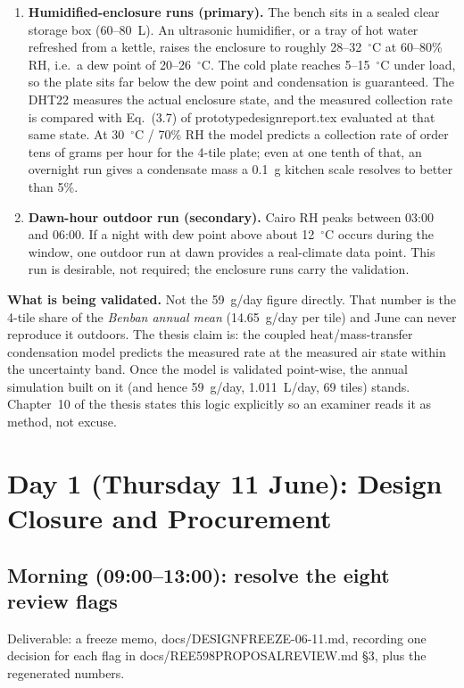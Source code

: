 \documentclass[11pt,a4paper]{article}
\newcommand{\f}[1]{{\ttfamily\def\_{\textunderscore\allowbreak}#1}}
\begin{document}
\begin{enumerate}[leftmargin=*]
  \item \textbf{Humidified-enclosure runs (primary).} The bench sits in a
        sealed clear storage box (60--80~L). An ultrasonic humidifier, or a
        tray of hot water refreshed from a kettle, raises the enclosure to
        roughly 28--32~$^{\circ}$C at 60--80\% RH, i.e.\ a dew point of
        20--26~$^{\circ}$C. The cold plate reaches 5--15~$^{\circ}$C under
        load, so the plate sits far below the dew point and condensation is
        guaranteed. The DHT22 measures the actual enclosure state, and the
        measured collection rate is compared with Eq.~(3.7) of
        \f{prototype\_design\_report.tex} evaluated at that same state. At
        30~$^{\circ}$C / 70\% RH the model predicts a collection rate of
        order tens of grams per hour for the 4-tile plate; even at one tenth
        of that, an overnight run gives a condensate mass a 0.1~g kitchen
        scale resolves to better than 5\%.
  \item \textbf{Dawn-hour outdoor run (secondary).} Cairo RH peaks between
        03:00 and 06:00. If a night with dew point above about
        12~$^{\circ}$C occurs during the window, one outdoor run at dawn
        provides a real-climate data point. This run is desirable, not
        required; the enclosure runs carry the validation.
\end{enumerate}

\textbf{What is being validated.} Not the 59~g/day figure directly. That
number is the 4-tile share of the \emph{Benban annual mean} (14.65~g/day per
tile) and June can never reproduce it outdoors. The thesis claim is: the
coupled heat/mass-transfer condensation model predicts the measured rate at
the measured air state within the uncertainty band. Once the model is
validated point-wise, the annual simulation built on it (and hence 59~g/day,
1.011~L/day, 69 tiles) stands. Chapter~10 of the thesis states this logic
explicitly so an examiner reads it as method, not excuse.

\section{Day 1 (Thursday 11 June): Design Closure and Procurement}

\subsection*{Morning (09:00--13:00): resolve the eight review flags}
Deliverable: a freeze memo, \f{docs/DESIGN\_FREEZE\_2026-06-11.md}, recording
one decision for each flag in \f{docs/REE598\_PROPOSAL\_REVIEW.md} \S3, plus
the regenerated numbers.
\end{document}
